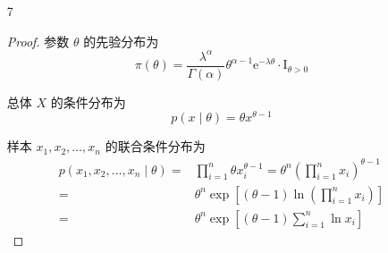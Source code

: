 \documentclass[normal,founder,mtpro2,cn]{elegantnote}
\begin{document}
\begin{enumerate}
\begin{proof}
\begin{enumerate}
                      可得样本 $x_{1},x_{2},\ldots,x_{n}$ 的边际分布为
                      \begin{equation*}
                          m\left(x_{1},x_{2},\ldots,x_{n}\right)=\int_{x(n)}^{1}\frac{3\cdot 2^{n}}{\theta^{2n-2}}\prod_{i=1}^{n}x_{i}\,\mathrm{d}\theta=\frac{3\cdot 2^{n}}{2n-3}\prod_{i=1}^{n}x_{i}\left[x_{(n)}^{-(2n-3)}-1\right]
                      \end{equation*}

                      因此 $\theta$ 的后验分布为
                      \begin{equation*}
                          \pi\left(\theta\mid x_{1},x_{2},\ldots,x_{n}\right)=\frac{2n-3}{\theta^{2n-2}\left[x_{(n)}^{-(2n-3)}-1\right]},\quad x_{(n)}<\theta<1
                      \end{equation*}
            \end{enumerate}
        \end{proof}
    \item[7]
        \begin{proof}
            参数 $\theta$ 的先验分布为
            \begin{equation*}
                \pi(\theta)=\frac{\lambda^{\alpha}}{\Gamma(\alpha)}\theta^{\alpha-1}\mathrm{e}^{-\lambda\theta}\cdot\mathrm{I}_{\theta>0}
            \end{equation*}

            总体 $X$ 的条件分布为
            \begin{equation*}
                p\left(x\mid\theta\right)=\theta x^{\theta-1}
            \end{equation*}

            样本 $x_{1},x_{2},\ldots,x_{n}$ 的联合条件分布为
            \begin{equation*}
                \begin{aligned}
                    p\left(x_{1},x_{2},\ldots,x_{n}\mid\theta\right)= & \prod_{i=1}^{n}\theta x_{i}^{\theta-1} = \theta^{n}\left(\prod_{i=1}^{n}x_{i}\right)^{\theta-1} \\
                    =                                                 & \theta^{n}\exp\left[(\theta-1)\ln\left(\prod_{i=1}^{n}x_{i}\right)\right]                       \\
                    =                                                 & \theta^{n}\exp\left[(\theta-1)\sum_{i=1}^{n}\ln x_{i}\right]
                \end{aligned}
            \end{equation*}


\end{proof}
\end{enumerate}
\end{document}
